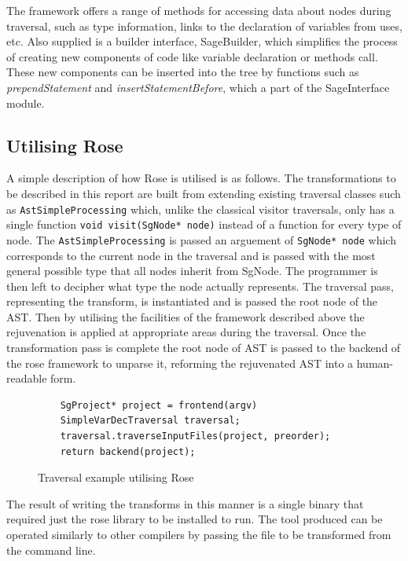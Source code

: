 \documentclass[bsc,frontabs,singlespacing,twoside,parskip,deptreport]{infthesis}
\begin{document}
The framework offers a range of methods for accessing data about nodes during traversal, such as type information, links to the declaration of variables from uses, etc. Also supplied is a builder interface, SageBuilder, which simplifies the process of creating new components of code like variable declaration or methods call. These new components can be inserted into the tree by functions such as \textit{prependStatement} and \textit{insertStatementBefore}, which a part of the SageInterface module. 


\subsection{Utilising Rose} \label{UTIL_ROSE}

A simple description of how Rose is utilised is as follows. The transformations to be described in this report are built from extending existing traversal classes such as  \texttt{AstSimpleProcessing} \cite{ROSE_MANUAL} which, unlike the classical visitor traversals, only has a single function \texttt{void visit(SgNode* node)} instead of a function for every type of node. The \texttt{AstSimpleProcessing} is passed an arguement of \texttt{SgNode* node} which corresponds to the current node in the traversal and is passed with the most general possible type that all nodes inherit from SgNode. The programmer is then left to decipher what type the node actually represents. The traversal pass, representing the transform, is instantiated and is passed the root node of the AST. Then by utilising the facilities of the framework described above the rejuvenation is applied at appropriate areas during the traversal. Once the transformation pass is complete the root node of AST is passed to the backend of the rose framework to unparse it, reforming the rejuvenated AST into a human-readable form.    

\begin{figure}[!h]
    \centering
    \begin{verbatim}
    SgProject* project = frontend(argv)
    SimpleVarDecTraversal traversal;
    traversal.traverseInputFiles(project, preorder);
    return backend(project);
    \end{verbatim}
    \caption{Traversal example utilising Rose}
    \label{fig:trav-proj}
\end{figure}

The result of writing the transforms in this manner is a single binary that required just the rose library to be installed to run. The tool produced can be operated similarly to other compilers by passing the file to be transformed from the command line.
\end{document}
